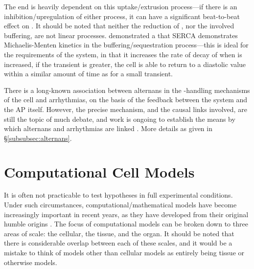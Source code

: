 \documentclass[../thesis-main.tex]{subfiles}
\begin{document}
 The end \cadia{} is heavily dependent on this uptake/extrusion process---if there is an inhibition/upregulation of either process, it can have a significant beat-to-beat effect on \cadia{}. It should be noted that neither the reduction of \cai{}, nor the involved buffering, are not linear processes. \citet{Bers1995} demonstrated a that SERCA demonstrates Michaelis-Menten kinetics in the buffering/sequestration process---this is ideal for the requirements of the system, in that it increases the rate of decay of \cai{} when \cai{} is increased, \idest{} if the \ca{} transient is greater, the cell is able to return \cai{} to a diastolic value within a similar amount of time as for a small transient.
 
 There is a long-known association between alternans in the \ca{}-handling mechanisms of the cell and arrhythmias, on the basis of the feedback between the \ca{} system and the AP itself. However, the precise mechanism, and the causal links involved, are still the topic of much debate, and work is ongoing to establish the means by which alternans and arrhythmias are linked \citep{Alvarez-Lacalle2013, Chen2009, Restrepo2008}. More details as given in \S\ref{subsubsec:alternans}.
 
 
 
 
 \section{Computational Cell Models}
 \label{sec:cell-models}
 It is often not practicable to test hypotheses in full experimental conditions. Under such circumstances, computational/mathematical models have become increasingly important in recent years, as they have developed from their original humble origins \citep{Jalife2013}. The focus of computational models can be broken down to three areas of scale: the cellular, the tissue, and the organ. It should be noted that there is considerable overlap between each of these scales, and it would be a mistake to think of models other than cellular models as entirely being tissue or otherwise models.
 
\end{document}
